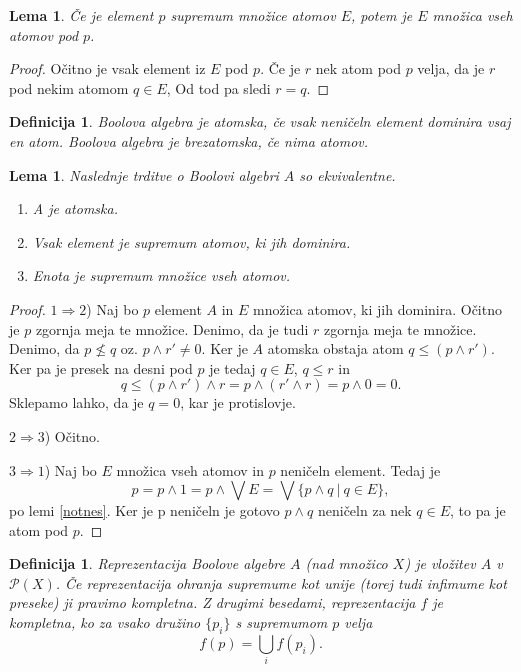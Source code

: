 \documentclass{amsart}
\newtheorem{lema}[izrek]{Lema}
\newtheorem{definicija}[izrek]{Definicija}
\begin{document}
\begin{lema}
    Če je element \(p\) supremum množice atomov \(E\), potem je \(E\) množica vseh atomov pod \(p\).
\end{lema}

\begin{proof}
    Očitno je vsak element iz $E$ pod $p$. 
    Če je $r$ nek atom pod $p$ velja, da je $r$ pod nekim atomom \(q \in E\),
    Od tod pa sledi $r = q$.
\end{proof}


\begin{definicija}
    Boolova algebra je atomska, če vsak neničeln element dominira vsaj en atom. 
    Boolova algebra je brezatomska, če nima atomov.
\end{definicija}

\begin{lema}
    Naslednje trditve o Boolovi algebri \(A\) so ekvivalentne.
    \begin{enumerate}
        \item A je atomska.
        \item Vsak element je supremum atomov, ki jih dominira.
        \item Enota je supremum množice vseh atomov.
    \end{enumerate}
\end{lema}

\begin{proof}
    \(1 \Rightarrow 2\)) Naj bo $p$ element $A$ in $E$ množica atomov, ki 
    jih dominira. Očitno je $p$ zgornja meja te množice. Denimo, da je tudi $r$ 
    zgornja meja te množice. Denimo, da \(p \nleq q\) oz. \(p \wedge  r' \neq 0\).
    Ker je $A$ atomska obstaja atom \(q \leq (p \wedge r')\). Ker pa je presek 
    na desni pod $p$ je tedaj $q \in E$, $q \leq r$ in
    \[q \leq (p \wedge r') \wedge r = p \wedge (r' \wedge r) = p \wedge 0 = 0.\]
    Sklepamo lahko, da je $q = 0$, kar je protislovje.

    \(2 \Rightarrow 3\)) Očitno. 


    \(3 \Rightarrow 1\)) Naj bo \(E\) množica vseh atomov in $p$ neničeln element.
    Tedaj je 
    \[p = p \wedge 1 = p \wedge \bigvee E = \bigvee \{p \wedge q~|~q\in E\},\]
    po lemi \ref*{notnes}. Ker je p neničeln je gotovo \(p \wedge q\) neničeln 
    za nek \(q \in E\), to pa je atom pod \(p\).
\end{proof}

\begin{definicija}
    Reprezentacija Boolove algebre $A$ (nad množico $X$) je vložitev $A$
    v \(\mathcal{P}(X)\). Če reprezentacija ohranja supremume kot unije
    (torej tudi infimume kot preseke) ji pravimo kompletna. Z drugimi besedami, 
    reprezentacija $f$ je kompletna, ko za vsako družino \(\{p_i\}\)
    s supremumom \(p\) velja 
    \[f(p) = \bigcup_i f(p_i).\]
\end{definicija}
\end{document}
